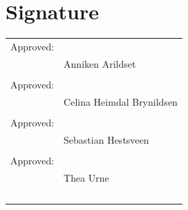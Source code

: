 \newpage

\newpage
\section{Signature}

\begin{tabular}{@{}p{.5in}p{4in}@{}}\\
Approved: & \hrulefill \\
& Anniken Arildset \\
\\
Approved: & \hrulefill \\
& Celina Heimdal Brynildsen \\
\\
Approved: & \hrulefill \\
& Sebastian Hestsveen \\
\\
Approved: & \hrulefill \\
& Thea Urne
\\~\\
\end{tabular}
\newpage






